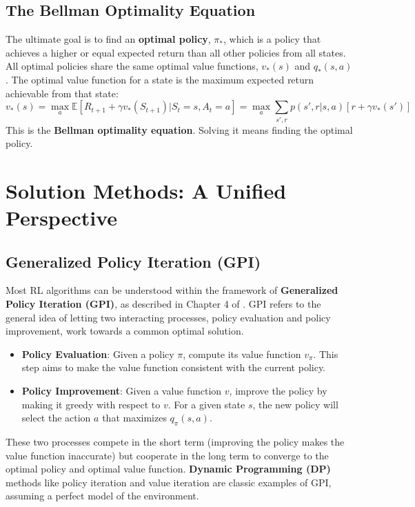 \subsection{The Bellman Optimality Equation}
The ultimate goal is to find an \textbf{optimal policy}, $\pi_*$, which is a policy that achieves a higher or equal expected return than all other policies from all states. All optimal policies share the same optimal value functions, $v_*(s)$ and $q_*(s, a)$. The optimal value function for a state is the maximum expected return achievable from that state:
\begin{equation}
    v_*(s) = \max_a \mathbb{E}[R_{t+1} + \gamma v_*(S_{t+1}) | S_t=s, A_t=a] = \max_a \sum_{s', r} p(s', r | s, a) [r + \gamma v_*(s')]
\end{equation}
This is the \textbf{Bellman optimality equation}. Solving it means finding the optimal policy.

\section{Solution Methods: A Unified Perspective}
\subsection{Generalized Policy Iteration (GPI)}
Most RL algorithms can be understood within the framework of \textbf{Generalized Policy Iteration (GPI)}, as described in Chapter 4 of \cite{Sutton2018}. GPI refers to the general idea of letting two interacting processes, policy evaluation and policy improvement, work towards a common optimal solution.

\begin{itemize}
    \item \textbf{Policy Evaluation}: Given a policy $\pi$, compute its value function $v_\pi$. This step aims to make the value function consistent with the current policy.
    \item \textbf{Policy Improvement}: Given a value function $v$, improve the policy by making it greedy with respect to $v$. For a given state $s$, the new policy will select the action $a$ that maximizes $q_\pi(s, a)$.
\end{itemize}

These two processes compete in the short term (improving the policy makes the value function inaccurate) but cooperate in the long term to converge to the optimal policy and optimal value function. \textbf{Dynamic Programming (DP)} methods like policy iteration and value iteration are classic examples of GPI, assuming a perfect model of the environment.

